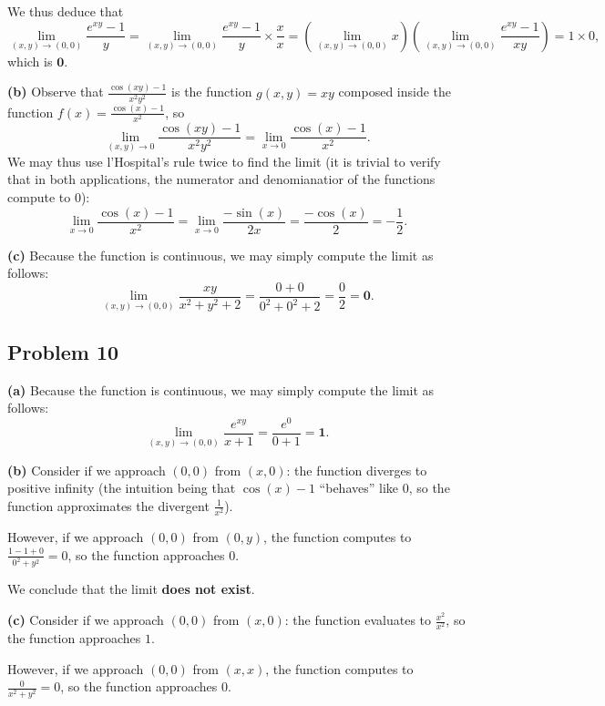 \documentclass[11pt]{article}
\begin{document}
We thus deduce that
\[
	\lim\limits_{(x, y) \to (0, 0)} \frac{e^{xy} - 1}{y} = \lim\limits_{(x, y) \to (0, 0)} \frac{e^{xy} - 1}{y} \times \frac{x}{x} = \left( \lim\limits_{(x, y) \to (0, 0)} x \right) \left( \lim\limits_{(x, y) \to (0, 0)} \frac{e^{xy} - 1}{xy} \right) = 1 \times 0,
\]
which is $\mathbf{0}$.

\textbf{(b)} Observe that $\frac{\cos(xy) - 1}{x^{2}y^{2}}$ is the function $g(x, y) = xy$ composed inside the function $f(x) = \frac{\cos(x) - 1}{x^{2}}$, so
\[
	\lim\limits_{(x, y) \to 0} \frac{\cos(xy) - 1}{x^{2}y^{2}} = \lim\limits_{x \to 0} \frac{\cos(x) - 1}{x^{2}}.
\]
We may thus use l'Hospital's rule twice to find the limit (it is trivial to verify that in both applications, the numerator and denomianatior of the functions compute to $0$):
\[
	\lim\limits_{x \to 0} \frac{\cos(x) - 1}{x^{2}} = \lim\limits_{x \to 0} \frac{-\sin(x)}{2x} = \frac{-\cos(x)}{2} = -\frac{1}{2}.
\]

\textbf{(c)} Because the function is continuous, we may simply compute the limit as follows:
\[
	\lim\limits_{(x, y) \to (0, 0)} \frac{xy}{x^{2} + y^{2} + 2} = \frac{0 + 0}{0^{2} + 0^{2} + 2} = \frac{0}{2} = \mathbf{0}.
\]


\subsection{Problem 10}

\textbf{(a)} Because the function is continuous, we may simply compute the limit as follows:
\[
	\lim\limits_{(x, y) \to (0, 0)} \frac{e^{xy}}{x + 1} = \frac{e^{0}}{0 + 1} = \mathbf{1}.
\]

\textbf{(b)} Consider if we approach $(0, 0)$ from $(x, 0)$: the function diverges to positive infinity (the intuition being that $\cos(x) - 1$ ``behaves'' like $0$, so the function approximates the divergent $\tfrac{1}{x^{2}}$).

However, if we approach $(0, 0)$ from $(0, y)$, the function computes to $\tfrac{1 - 1 + 0}{0^{2} + y^{2}} = 0$, so the function approaches $0$.

We conclude that the limit \textbf{does not exist}.

\textbf{(c)} Consider if we approach $(0, 0)$ from $(x, 0)$: the function evaluates to $\tfrac{x^{2}}{x^{2}}$, so the function approaches $1$.

However, if we approach $(0, 0)$ from $(x, x)$, the function computes to $\tfrac{0}{x^{2} + y^{2}} = 0$, so the function approaches $0$.
\end{document}
